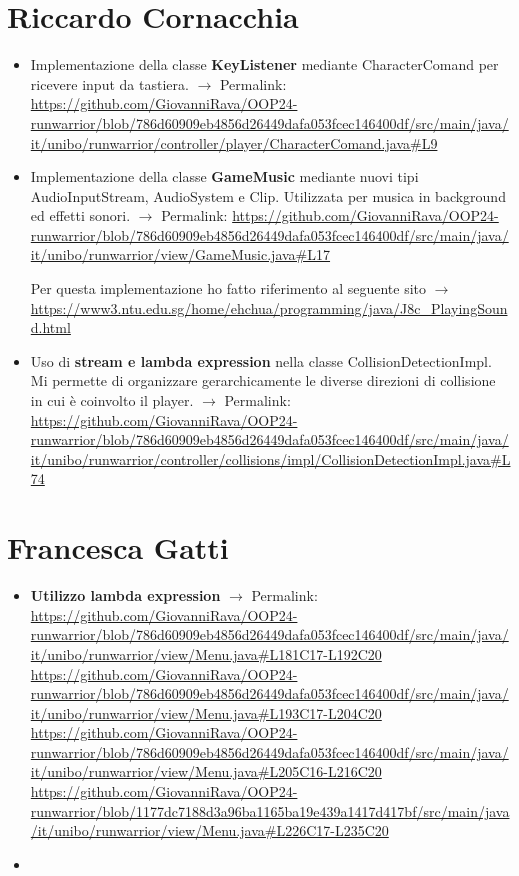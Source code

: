 \documentclass[a4paper,12pt]{report}
\begin{document}
\section{Riccardo Cornacchia}
\begin{itemize}
    \item Implementazione della classe \textbf{KeyListener} mediante CharacterComand per ricevere input da tastiera. $\rightarrow$ Permalink:
    \url{https://github.com/GiovanniRava/OOP24-runwarrior/blob/786d60909eb4856d26449dafa053fcec146400df/src/main/java/it/unibo/runwarrior/controller/player/CharacterComand.java#L9}
    \item Implementazione della classe \textbf{GameMusic} mediante nuovi tipi AudioInputStream, AudioSystem e Clip. 
    Utilizzata per musica in background ed effetti sonori. $\rightarrow$ Permalink:
    \url{https://github.com/GiovanniRava/OOP24-runwarrior/blob/786d60909eb4856d26449dafa053fcec146400df/src/main/java/it/unibo/runwarrior/view/GameMusic.java#L17}
    
    Per questa implementazione ho fatto riferimento al seguente sito $\rightarrow$
    \url{https://www3.ntu.edu.sg/home/ehchua/programming/java/J8c_PlayingSound.html}
    \item Uso di \textbf{stream e lambda expression} nella classe CollisionDetectionImpl. Mi permette di organizzare gerarchicamente 
    le diverse direzioni di collisione in cui è coinvolto il player. $\rightarrow$ Permalink:
    \url{https://github.com/GiovanniRava/OOP24-runwarrior/blob/786d60909eb4856d26449dafa053fcec146400df/src/main/java/it/unibo/runwarrior/controller/collisions/impl/CollisionDetectionImpl.java#L74}
\end{itemize}

\section{Francesca Gatti}
\begin{itemize}
    \item \textbf{Utilizzo lambda expression} $\rightarrow$ Permalink:
    \url{https://github.com/GiovanniRava/OOP24-runwarrior/blob/786d60909eb4856d26449dafa053fcec146400df/src/main/java/it/unibo/runwarrior/view/Menu.java#L181C17-L192C20}
    \url{https://github.com/GiovanniRava/OOP24-runwarrior/blob/786d60909eb4856d26449dafa053fcec146400df/src/main/java/it/unibo/runwarrior/view/Menu.java#L193C17-L204C20}
    \url{https://github.com/GiovanniRava/OOP24-runwarrior/blob/786d60909eb4856d26449dafa053fcec146400df/src/main/java/it/unibo/runwarrior/view/Menu.java#L205C16-L216C20}
    \url{https://github.com/GiovanniRava/OOP24-runwarrior/blob/1177dc7188d3a96ba1165ba19e439a1417d417bf/src/main/java/it/unibo/runwarrior/view/Menu.java#L226C17-L235C20}
    \item
\end{itemize}
\end{document}
